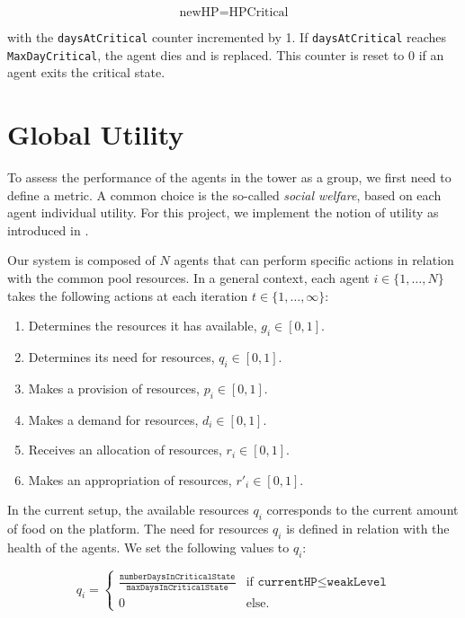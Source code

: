 \begin{equation}\label{hpDecay_critical_stay}
    \text{newHP} = \text{HPCritical}
\end{equation}

with the \texttt{daysAtCritical} counter incremented by 1. If \texttt{daysAtCritical} reaches \texttt{MaxDayCritical}, the agent dies and is replaced. This counter is reset to 0 if an agent exits the critical state.




\section{Global Utility}\label{global_utility}

To assess the performance of the agents in the tower as a group, we first need to define a metric. A common choice is the so-called \emph{social welfare}, based on each agent individual utility. For this project, we implement the notion of utility as introduced in \cite{somasPitt}.

Our system is composed of $N$ agents that can perform specific actions in relation with the common pool resources. In a general context, each agent 
$i\in\{1, \ldots, N\}$ takes the following actions at each iteration $t\in\{1,\ldots,\infty\}$:

\begin{enumerate}
    \item Determines the resources it has available, $g_i \in [0,1]$.
    \item Determines its need for resources, $q_i \in [0,1]$.
    \item Makes a provision of resources, $p_i \in [0,1]$.
    \item Makes a demand for resources, $d_i \in [0,1]$.
    \item Receives an allocation of resources, $r_i \in [0,1]$.
    \item Makes an appropriation of resources, $r'_i \in [0,1]$.
\end{enumerate}

In the current setup, the available resources $q_i$ corresponds to the current amount of food on the platform.  The need for resources $q_i$ is defined in relation with the health of the agents. We set the following values to $q_i$:

\begin{equation}\label{resources_needed}
    q_i=\begin{cases}
     \frac{\texttt{numberDaysInCriticalState}}{\texttt{maxDaysInCriticalState}} & \mbox{if } \texttt{currentHP}\leq \texttt{weakLevel}  \\ 
     0 & \mbox{else.}
     \end{cases}
\end{equation}

